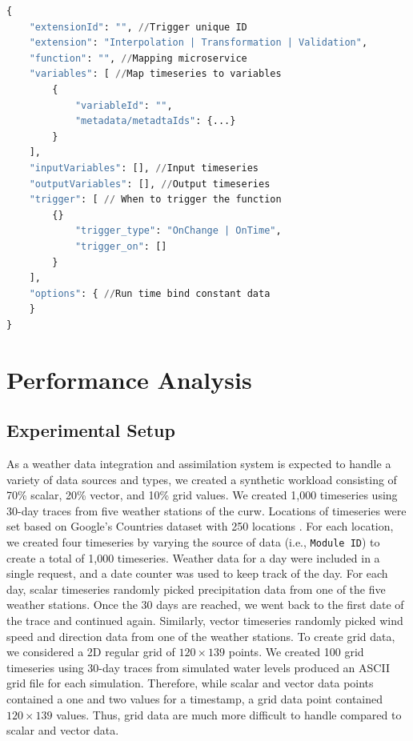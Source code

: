 \documentclass[conference]{IEEEtran}
\begin{document}
\begin{minipage}{0.47\textwidth}
\begin{lstlisting}[language=Python, caption=Format of a request made to update an extension., label=pli:extension_triggers]
{
    "extensionId": "", //Trigger unique ID
    "extension": "Interpolation | Transformation | Validation",
    "function": "", //Mapping microservice
    "variables": [ //Map timeseries to variables
        {
            "variableId": "",
            "metadata/metadtaIds": {...}
        } 
    ],
    "inputVariables": [], //Input timeseries
    "outputVariables": [], //Output timeseries
    "trigger": [ // When to trigger the function
        {}
            "trigger_type": "OnChange | OnTime",
            "trigger_on": []
        }
    ],
    "options": { //Run time bind constant data
    }
}
\end{lstlisting}
\end{minipage}


\section{Performance Analysis}
\label{pse:performance_analysis}

\subsection{Experimental Setup}
\label{psubse:experimental_setup}

As a weather data integration and assimilation system is expected to handle a variety of data sources and types, we created a synthetic workload consisting of 70\% scalar, 20\% vector, and 10\% grid values. 
We created 1,000 timeseries using 30-day traces from five weather stations of the \acrlong{curw}. Locations of timeseries were set based on Google's Countries dataset with 250 locations \cite{GoogleGoogleCounties}. 
For each location, we created four timeseries by varying the source of data (i.e., \texttt{Module ID}) to create a total of 1,000 timeseries. Weather data for a day were included in a single request, and a date counter was used to keep track of the day. For each day, scalar timeseries randomly picked precipitation data from one of the five weather stations. Once the 30 days are reached, we went back to the first date of the trace and continued again. Similarly, vector timeseries randomly picked wind speed and direction data from one of the weather stations. To create grid data, we considered a 2D regular grid of $120\times139$ points. 
We created 100 grid timeseries using 30-day traces from simulated water levels produced an ASCII grid file for each simulation.
Therefore, while scalar and vector data points contained a one and two values for a timestamp, a grid data point contained $120\times139$ values. Thus, grid data are much more difficult to handle compared to scalar and vector data.
\end{document}

